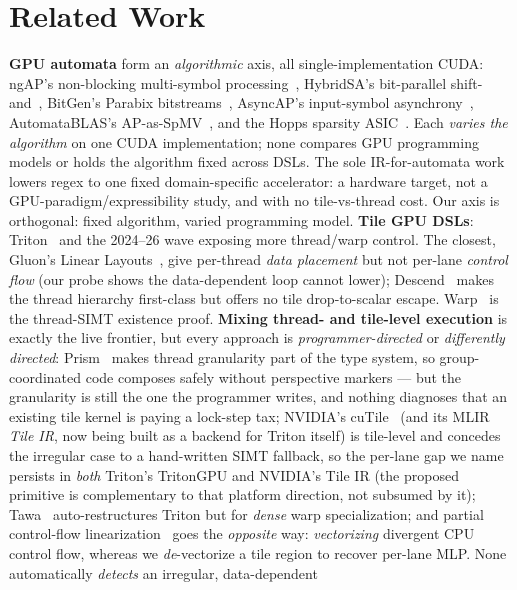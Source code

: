 \documentclass[sigplan,10pt]{acmart}
\begin{document}
\section{Related Work}
\textbf{GPU automata} form an \emph{algorithmic} axis, all single-implementation CUDA: ngAP's
non-blocking multi-symbol processing~\cite{ngap2024}, HybridSA's bit-parallel
shift-and~\cite{hybridsa2024}, BitGen's Parabix bitstreams~\cite{bitgen2025}, AsyncAP's
input-symbol asynchrony~\cite{asyncap2023}, AutomataBLAS's AP-as-SpMV~\cite{automatablas2025}, and
the Hopps sparsity ASIC~\cite{hopps2025}. Each \emph{varies the algorithm} on one CUDA
implementation; none compares GPU programming models or holds the algorithm fixed across DSLs. The
sole IR-for-automata work~\cite{mlirregex2025} lowers regex to one fixed domain-specific accelerator:
a hardware target, not a GPU-paradigm/expressibility study, and with no tile-vs-thread cost. Our
axis is orthogonal: fixed algorithm, varied programming model.
\textbf{Tile GPU DSLs}: Triton~\cite{triton2019} and the 2024--26 wave exposing more thread/warp
control. The closest, Gluon's Linear Layouts~\cite{linearlayouts2025}, give per-thread \emph{data
placement} but not per-lane \emph{control flow} (our probe shows the data-dependent loop cannot
lower); Descend~\cite{descend2024} makes the thread hierarchy first-class but offers no tile
drop-to-scalar escape. Warp~\cite{warp2022} is the thread-SIMT existence proof.
\textbf{Mixing thread- and tile-level execution} is exactly the live frontier, but every approach is
\emph{programmer-directed} or \emph{differently directed}: Prism~\cite{prism2026} makes thread
granularity part of the type system, so group-coordinated code composes safely without perspective
markers --- but the granularity is still the one the programmer writes, and nothing diagnoses that an
existing tile kernel is paying a lock-step tax; NVIDIA's cuTile~\cite{cutile2025} (and its MLIR \emph{Tile IR}, now
being built as a backend for Triton itself) is tile-level and concedes the irregular case to a
hand-written SIMT fallback, so the per-lane gap we name persists in \emph{both} Triton's TritonGPU and
NVIDIA's Tile IR (the proposed primitive is complementary to that platform direction, not subsumed by it); Tawa~\cite{tawa2026} auto-restructures Triton but for
\emph{dense} warp specialization; and partial control-flow linearization~\cite{partialcfg2018} goes the
\emph{opposite} way: \emph{vectorizing} divergent CPU control flow, whereas we \emph{de}-vectorize a
tile region to recover per-lane MLP. None automatically \emph{detects} an irregular, data-dependent
\end{document}

